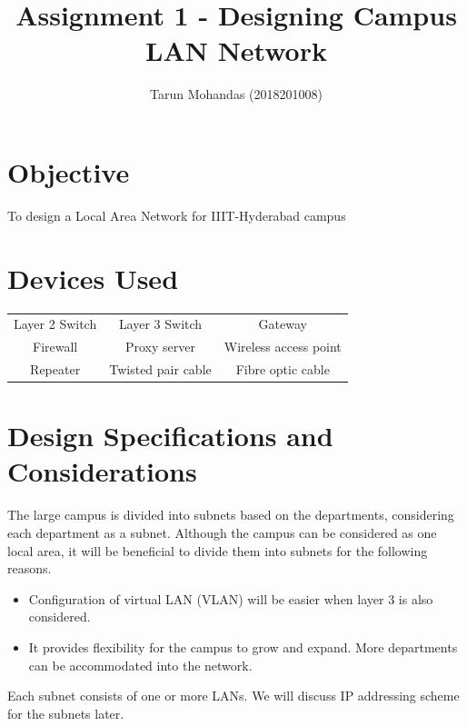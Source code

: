 \documentclass{article}
\title{\Large{Assignment 1 - Designing Campus LAN Network}}
\author{Tarun Mohandas (2018201008)}
\date{ }
\begin{document}
\maketitle

\section{Objective}
To design a Local Area Network for IIIT-Hyderabad campus

\section{Devices Used}
\begin{center}
	\begin{tabular}{ c c c }
		
		Layer 2 Switch & Layer 3 Switch &  Gateway \\ 
		 Firewall & Proxy server &  Wireless access point \\  
		 Repeater & Twisted pair cable &  Fibre optic cable 

    
\end{tabular}

\end{center}

\section{Design Specifications and Considerations}

The large campus is divided into subnets based on the departments, considering each department as a subnet. Although the campus can be considered as one local area, it will be beneficial to divide them into subnets for the following reasons.
\begin{itemize}
	\item Configuration of virtual LAN (VLAN) will be easier when layer 3 is also considered.
	\item It provides flexibility for the campus to grow and expand. More departments can be accommodated into the network.
\end{itemize}
Each subnet consists of one or more LANs. We will discuss IP addressing scheme for the subnets later.
\end{document}
